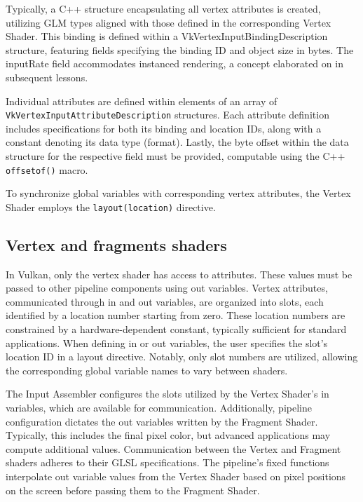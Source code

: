 Typically, a C++ structure encapsulating all vertex attributes is created, utilizing GLM types aligned with those defined in the corresponding Vertex Shader. 
This binding is defined within a VkVertexInputBindingDescription structure, featuring fields specifying the binding ID and object size in bytes.
The inputRate field accommodates instanced rendering, a concept elaborated on in subsequent lessons.

Individual attributes are defined within elements of an array of \\\texttt{VkVertexInputAttributeDescription} structures. 
Each attribute definition includes specifications for both its binding and location IDs, along with a constant denoting its data type (format). 
Lastly, the byte offset within the data structure for the respective field must be provided, computable using the C++ \texttt{offsetof()} macro.

To synchronize global variables with corresponding vertex attributes, the Vertex Shader employs the \texttt{layout(location)} directive.

\subsection{Vertex and fragments shaders}
In Vulkan, only the vertex shader has access to attributes. These values must be passed to other pipeline components using out variables. 
Vertex attributes, communicated through in and out variables, are organized into slots, each identified by a location number starting from zero. 
These location numbers are constrained by a hardware-dependent constant, typically sufficient for standard applications. 
When defining in or out variables, the user specifies the slot's location ID in a layout directive. 
Notably, only slot numbers are utilized, allowing the corresponding global variable names to vary between shaders.

The Input Assembler configures the slots utilized by the Vertex Shader's in variables, which are available for communication. 
Additionally, pipeline configuration dictates the out variables written by the Fragment Shader. 
Typically, this includes the final pixel color, but advanced applications may compute additional values. 
Communication between the Vertex and Fragment shaders adheres to their GLSL specifications. 
The pipeline's fixed functions interpolate out variable values from the Vertex Shader based on pixel positions on the screen before passing them to the Fragment Shader.

